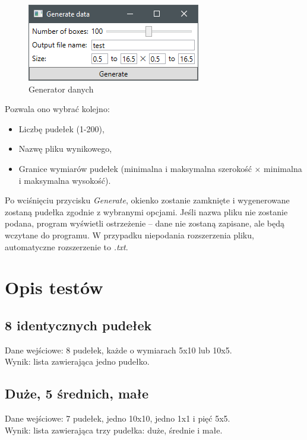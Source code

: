 \documentclass{article}
\begin{document}
\begin{figure}[H]
\centering
\includegraphics{generate.png}
\caption{Generator danych}
\end{figure}
Pozwala ono wybrać kolejno:
\begin{itemize}
\item Liczbę pudełek (1-200),
\item Nazwę pliku wynikowego,
\item Granice wymiarów pudełek (minimalna i maksymalna szerokość $\times$ minimalna i maksymalna wysokość).
\end{itemize}
Po wciśnięciu przycisku \textit{Generate}, okienko zostanie zamknięte i wygenerowane zostaną pudełka zgodnie z wybranymi opcjami. Jeśli nazwa pliku nie zostanie podana, program wyświetli ostrzeżenie -- dane nie zostaną zapisane, ale będą wczytane do programu. W przypadku niepodania rozszerzenia pliku, automatyczne rozszerzenie to \textit{.txt}.

\section{Opis testów}
\subsection{8 identycznych pudełek}
Dane wejściowe: 8 pudełek, każde o wymiarach 5x10 lub 10x5. \\
Wynik: lista zawierająca jedno pudełko.

\subsection{Duże, 5 średnich, małe}
Dane wejściowe: 7 pudełek, jedno 10x10, jedno 1x1 i pięć 5x5. \\
Wynik: lista zawierająca trzy pudełka: duże, średnie i małe.
\end{document}
